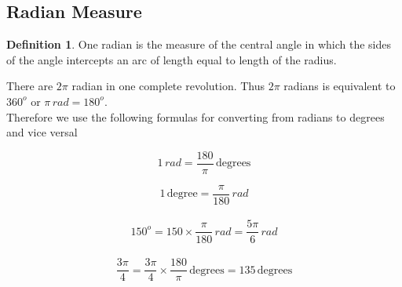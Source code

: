 \documentclass[11pt,a4paper]{article}
\theoremstyle{definition}
\newtheorem{definition}[thm]{Definition}
\begin{document}
\subsection{Radian Measure}

\begin{definition}

One radian is the measure of the central angle in which the sides of the angle intercepts an arc of length equal to length of the radius.

\begin{figure}[H]
\centering
{}
\end{figure}















There are $2\pi$ radian in one complete revolution. Thus $2\pi$ radians is equivalent to $360^o$ or $\pi \, rad = 180^o$.\\

Therefore we use the following formulas for converting from radians to degrees and vice versal

$$1\, rad = \frac{180}{\pi}\,\text{degrees}$$

$$1\,\text{degree} = \frac{\pi}{180}\, rad$$\\




$$150^o = 150 \times \frac{\pi}{180}\,rad = \frac{5\pi}{6}\,rad$$\\

$$\frac{3\pi}{4} = \frac{3\pi}{4}\times \frac{180}{\pi}\,\text{degrees} = 135\,\text{degrees}$$\\









\end{definition}
\end{document}

